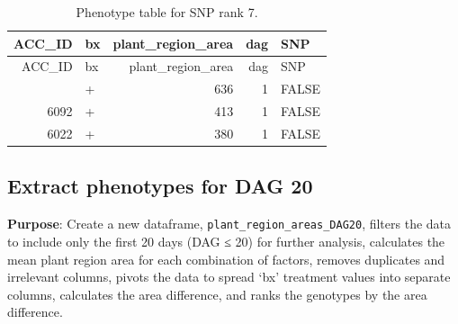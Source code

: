 \documentclass[
  11pt,
]{article}
\newenvironment{Shaded}{\begin{snugshade}}{\end{snugshade}}
\newcommand{\AttributeTok}[1]{\textcolor[rgb]{0.13,0.29,0.53}{#1}}
\newcommand{\CommentTok}[1]{\textcolor[rgb]{0.56,0.35,0.01}{\textit{#1}}}
\newcommand{\DecValTok}[1]{\textcolor[rgb]{0.00,0.00,0.81}{#1}}
\newcommand{\FunctionTok}[1]{\textcolor[rgb]{0.13,0.29,0.53}{\textbf{#1}}}
\newcommand{\NormalTok}[1]{#1}
\newcommand{\OtherTok}[1]{\textcolor[rgb]{0.56,0.35,0.01}{#1}}
\newcommand{\SpecialCharTok}[1]{\textcolor[rgb]{0.81,0.36,0.00}{\textbf{#1}}}
\newcommand{\StringTok}[1]{\textcolor[rgb]{0.31,0.60,0.02}{#1}}
\begin{document}
\begin{Shaded}
\end{Shaded}

\begin{longtable}[]{@{}rlrrl@{}}
\caption{Phenotype table for SNP rank 7.}\tabularnewline
\toprule\noalign{}
ACC\_ID & bx & plant\_region\_area & dag & SNP \\
\midrule\noalign{}
\endfirsthead
\toprule\noalign{}
ACC\_ID & bx & plant\_region\_area & dag & SNP \\
\midrule\noalign{}
\endhead
\bottomrule\noalign{}
\endlastfoot
9830 & + & 636 & 1 & FALSE \\
6092 & + & 413 & 1 & FALSE \\
6022 & + & 380 & 1 & FALSE \\
\end{longtable}

\subsection{Extract phenotypes for DAG
20}\label{extract-phenotypes-for-dag-20}

\textbf{Purpose}: Create a new dataframe,
\texttt{plant\_region\_areas\_DAG20}, filters the data to include only
the first 20 days (DAG ≤ 20) for further analysis, calculates the mean
plant region area for each combination of factors, removes duplicates
and irrelevant columns, pivots the data to spread `bx' treatment values
into separate columns, calculates the area difference, and ranks the
genotypes by the area difference.
\end{document}
